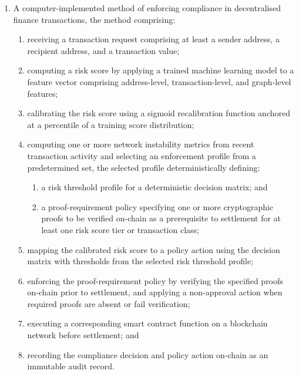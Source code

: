 \documentclass[12pt,a4paper]{article}
\begin{document}
\begin{enumerate}[label=\textbf{\arabic*.}]
\begin{enumerate}[label=(\alph*)]
\item an infrastructure layer comprising smart contracts deployed on a
blockchain network configured to enforce the determined policy actions before
settlement, including a core contract, an escrow contract, and a
zero-knowledge proof verifier contract;
\end{enumerate}
wherein all compliance decisions are enforced before the corresponding
transaction is settled on the blockchain network.

\item A computer-implemented method of enforcing compliance in decentralised
finance transactions, the method comprising:
\begin{enumerate}[label=(\alph*)]
\item receiving a transaction request comprising at least a sender address,
a recipient address, and a transaction value;
\item computing a risk score by applying a trained machine learning model
to a feature vector comprising address-level, transaction-level, and
graph-level features;
\item calibrating the risk score using a sigmoid recalibration function
anchored at a percentile of a training score distribution;
\item computing one or more network instability metrics from recent
transaction activity and selecting an enforcement profile from a
predetermined set, the selected profile deterministically defining:
\begin{enumerate}[label=(\roman*)]
\item a risk threshold profile for a deterministic decision matrix; and
\item a proof-requirement policy specifying one or more cryptographic proofs
to be verified on-chain as a prerequisite to settlement for at least one
risk score tier or transaction class;
\end{enumerate}
\item mapping the calibrated risk score to a policy action using the
decision matrix with thresholds from the selected risk threshold profile;
\item enforcing the proof-requirement policy by verifying the specified
proofs on-chain prior to settlement, and applying a non-approval action
when required proofs are absent or fail verification;
\item executing a corresponding smart contract function on a blockchain
network before settlement; and
\item recording the compliance decision and policy action on-chain as an
immutable audit record.
\end{enumerate}


\end{enumerate}
\end{document}
